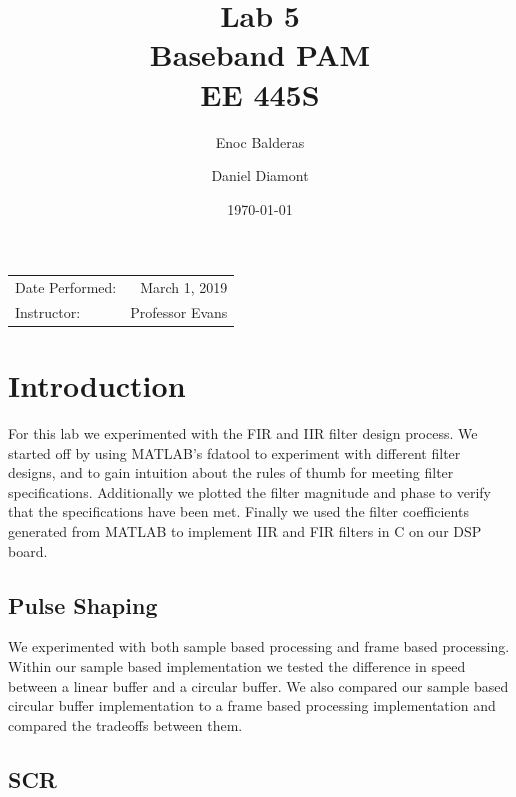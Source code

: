 \documentclass{article}
\title{Lab 5\\ Baseband PAM\\ EE 445S} %
\author{Enoc Balderas\\
        \and
        Daniel Diamont\\} %
\date{\today} %
\begin{document}
\maketitle %

\begin{center}
\begin{tabular}{l r}
Date Performed: & March 1, 2019 \\ %
Instructor: & Professor Evans %
\end{tabular}
\end{center}



\section{Introduction}

For this  lab we experimented with the FIR and IIR filter design process.
We started off by using MATLAB's fdatool to experiment with different filter designs, and to gain intuition about the rules of thumb for meeting filter specifications.
Additionally we plotted the filter magnitude and phase to verify that the specifications have been met.
Finally we used the filter coefficients generated from MATLAB to implement IIR and FIR filters in C on our DSP board.

\subsection{Pulse Shaping}

We experimented with both sample based processing and frame based processing.
Within our sample based implementation we tested the difference in speed between a linear buffer and a circular buffer.
We also compared our sample based circular buffer implementation to a frame based processing implementation and compared the tradeoffs between them.

\subsection{SCR}
\end{document}

